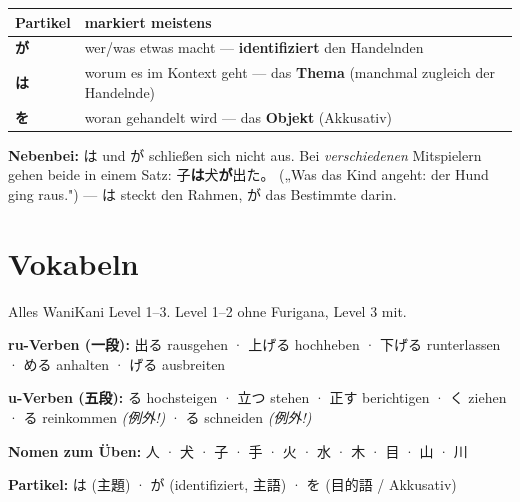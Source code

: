 \documentclass[11pt,a4paper,DIV=12]{scrartcl}
\begin{document}
\begin{center}
\begin{tabular}{@{}ll@{}}
\toprule
Partikel & markiert meistens \\
\midrule
\textbf{が} & wer/was etwas macht — \textbf{identifiziert} den Handelnden \\
\textbf{は} & worum es im Kontext geht — das \textbf{Thema} (manchmal zugleich der Handelnde) \\
\textbf{を} & woran gehandelt wird — das \textbf{Objekt} (Akkusativ) \\
\bottomrule
\end{tabular}
\end{center}

\begin{merke}
\textbf{Nebenbei:} は und が schließen sich nicht aus. Bei \emph{verschiedenen}
Mitspielern gehen beide in einem Satz: 子\textbf{は}犬\textbf{が}出た。 („Was das Kind
angeht: der Hund ging raus.") — は steckt den Rahmen, が das Bestimmte darin.
\end{merke}

\section*{Vokabeln}

Alles WaniKani Level 1–3. Level 1–2 ohne Furigana, Level 3 mit.

\textbf{ru-Verben (一段):} 出る rausgehen · 上げる hochheben · 下げる runterlassen ·
める anhalten · げる ausbreiten

\textbf{u-Verben (五段):} る hochsteigen · 立つ stehen · 正す berichtigen ·
く ziehen · る reinkommen \emph{(例外!)} ·
る schneiden \emph{(例外!)}

\textbf{Nomen zum Üben:} 人 · 犬 · 子 · 手 · 火 · 水 · 木 · 目 · 山 · 川

\textbf{Partikel:} は (主題) · が (identifiziert, 主語) · を (目的語 / Akkusativ)
\end{document}
